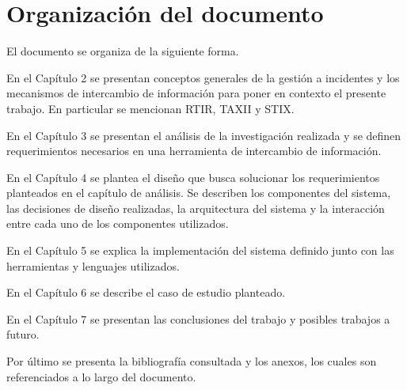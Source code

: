 \section{Organización del documento}
\label{capitulo1:organizacion}
El documento se organiza de la siguiente forma.

En el Capítulo 2 se presentan conceptos generales de la gestión a incidentes y los mecanismos de intercambio de información para poner en contexto el presente trabajo. En particular se mencionan RTIR, TAXII y STIX.

En el Capítulo 3 se presentan el análisis de la investigación realizada y se definen requerimientos necesarios en una herramienta de intercambio de información.

En el Capítulo 4 se plantea el diseño que busca solucionar los requerimientos planteados en el capítulo de análisis. Se describen los componentes del sistema, las decisiones de diseño realizadas, la arquitectura del sistema y la interacción entre cada uno de los componentes utilizados.

En el Capítulo 5 se explica la implementación del sistema definido junto con las herramientas y lenguajes utilizados.

En el Capítulo 6 se describe el caso de estudio planteado.

En el Capítulo 7 se presentan las conclusiones del trabajo y posibles trabajos a futuro.

Por último se presenta la bibliografía consultada y los anexos, los cuales son referenciados a lo largo del documento.
